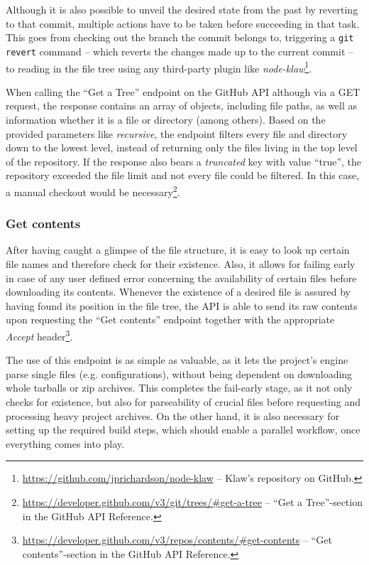 Although it is also possible to unveil the desired state from the past by reverting to that commit, multiple actions have to be taken before succeeding in that task. This goes from checking out the branch the commit belongs to, triggering a \texttt{git revert} command -- which reverts the changes made up to the current commit \cite{GitRevert} -- to reading in the file tree using any third-party plugin like \emph{node-klaw}\footnote{\url{https://github.com/jprichardson/node-klaw} -- Klaw's repository on GitHub.}.

When calling the ``Get a Tree'' endpoint on the GitHub API although via a GET request, the response contains an array of objects, including file paths, as well as information whether it is a file or directory (among others). Based on the provided parameters like \emph{recursive}, the endpoint filters every file and directory down to the lowest level, instead of returning only the files living in the top level of the repository. If the response also bears a \emph{truncated} key with value ``true'', the repository exceeded the file limit and not every file could be filtered. In this case, a manual checkout would be necessary\footnote{\url{https://developer.github.com/v3/git/trees/\#get-a-tree} -- ``Get a Tree''-section in the GitHub API Reference.}.

\subsubsection{Get contents}
After having caught a glimpse of the file structure, it is easy to look up certain file names and therefore check for their existence. Also, it allows for failing early in case of any user defined error concerning the availability of certain files before downloading its contents. Whenever the existence of a desired file is assured by having found its position in the file tree, the API is able to send its raw contents upon requesting the ``Get contents'' endpoint together with the appropriate \emph{Accept} header\footnote{\url{https://developer.github.com/v3/repos/contents/\#get-contents} -- ``Get contents''-section in the GitHub API Reference.}.

The use of this endpoint is as simple as valuable, as it lets the project's engine parse single files (e.g. configurations), without being dependent on downloading whole tarballs or zip archives. This completes the fail-early stage, as it not only checks for existence, but also for parseability of crucial files before requesting and processing heavy project archives. On the other hand, it is also necessary for setting up the required build steps, which should enable a parallel workflow, once everything comes into play.

